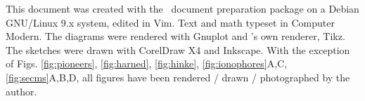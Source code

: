 \newpage
This document was created with the \LaTeXe \, document preparation package on a Debian GNU/Linux 9.x system, edited in Vim. Text and math typeset in Computer Modern.
The diagrams were rendered with Gnuplot and \LaTeXe's  own renderer, Tikz.
The sketches were drawn with CorelDraw X4 and Inkscape.
With the exception of Figs. \ref{fig:pioneers}, \ref{fig:harned}, \ref{fig:hinke}, \ref{fig:ionophores}A,C, \ref{fig:secms}A,B,D, all figures have been rendered / drawn / photographed by the author.
